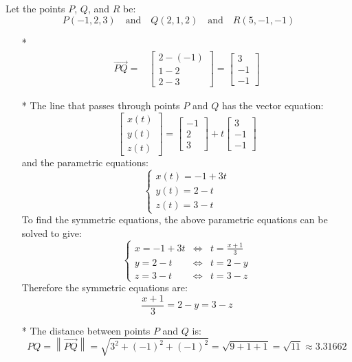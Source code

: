 \documentclass{article}
\begin{document}
Let the points \(P\), \(Q\), and \(R\) be:
\[P(-1, 2, 3) \quad\text{and}\quad Q(2, 1, 2) \quad\text{and}\quad R(5, -1, -1)\] 
\begin{itemize}
\item[*] \begin{align*}
\overrightarrow{PQ} = & \begin{bmatrix} 2 - (-1) \\ 1 - 2 \\ 2 - 3 \end{bmatrix} = \begin{bmatrix} 3 \\ -1 \\ -1 \end{bmatrix}
\end{align*}
\item[*] The line that passes through points \(P\) and \(Q\) has the vector equation:
\[\begin{bmatrix} x(t) \\ y(t) \\ z(t) \end{bmatrix} = \begin{bmatrix} -1 \\ 2 \\ 3 \end{bmatrix} + t\begin{bmatrix} 3 \\ -1 \\ -1 \end{bmatrix}\] 
and the parametric equations:
\[\left\{\begin{array}{c} 
x(t) = -1 + 3t \\ 
y(t) = 2 - t \\ 
z(t) = 3 - t 
\end{array}\right.\]
To find the symmetric equations, the above parametric equations can be solved to give:
 \[\left\{\begin{array}{ccc} 
x = -1 + 3t & \iff & t = \frac{x+1}{3} \\ 
y = 2 - t & \iff & t = 2 - y \\ 
z = 3 - t & \iff & t = 3 - z
\end{array}\right.\]
Therefore the symmetric equations are:
\[\frac{x+1}{3} = 2 - y = 3 - z\] 
\item[*] The distance between points \(P\) and \(Q\) is: 
\[PQ = \left\|\overrightarrow{PQ}\right\| = \sqrt{3^2 + (-1)^2 + (-1)^2} = \sqrt{9 + 1 + 1} = \sqrt{11} \approx 3.31662\]

\end{itemize}
\end{document}

